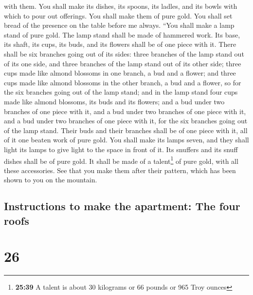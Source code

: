 with them.  You shall make its dishes, its spoons, its
ladles, and its bowls with which to pour out offerings. You shall make
them of pure gold.  You shall set bread of the presence
on the table before me always.  ``You shall make a lamp
stand of pure gold. The lamp stand shall be made of hammered work. Its
base, its shaft, its cups, its buds, and its flowers shall be of one
piece with it.  There shall be six branches going out of
its sides: three branches of the lamp stand out of its one side, and
three branches of the lamp stand out of its other side; 
three cups made like almond blossoms in one branch, a bud and a flower;
and three cups made like almond blossoms in the other branch, a bud and
a flower, so for the six branches going out of the lamp stand;
 and in the lamp stand four cups made like almond
blossoms, its buds and its flowers;  and a bud under two
branches of one piece with it, and a bud under two branches of one piece
with it, and a bud under two branches of one piece with it, for the six
branches going out of the lamp stand.  Their buds and
their branches shall be of one piece with it, all of it one beaten work
of pure gold.  You shall make its lamps seven, and they
shall light its lamps to give light to the space in front of it.
 Its snuffers and its snuff dishes shall be of pure gold.
 It shall be made of a talent\footnote{\textbf{25:39} A
  talent is about 30 kilograms or 66 pounds or 965 Troy ounces} of pure
gold, with all these accessories.  See that you make them
after their pattern, which has been shown to you on the mountain.

\hypertarget{instructions-to-make-the-apartment-the-four-roofs}{%
\subsection{Instructions to make the apartment: The four
roofs}\label{instructions-to-make-the-apartment-the-four-roofs}}

\hypertarget{section-25}{%
\section{26}\label{section-25}}

